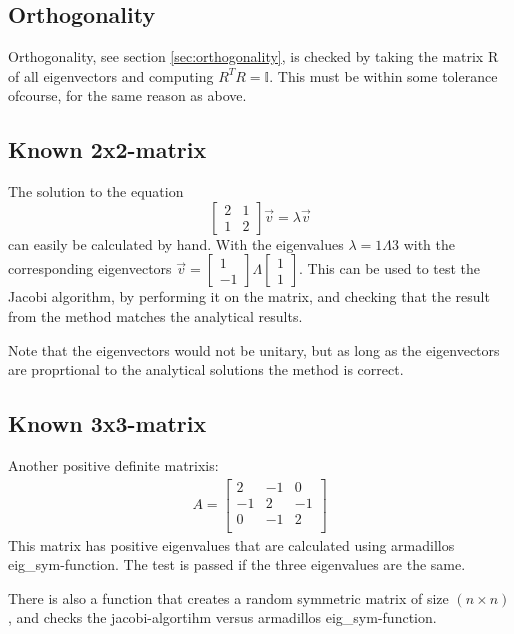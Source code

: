 \documentclass[11pt,a4paper,notitlepage]{article}
\newcommand{\eye}{\mathds{I}}
\begin{document}
\subsection{Orthogonality}
Orthogonality, see section \ref{sec:orthogonality}, is checked by taking the matrix R of all eigenvectors and computing $R^TR = \eye$. This must be within some tolerance ofcourse, for the same reason as above.
\subsection{Known 2x2-matrix}
The solution to the equation 
$$\begin{bmatrix}
	2 & 1 \\ 1 & 2
\end{bmatrix} \vec{v} = \lambda	 \vec{v} $$ 
can easily be calculated by hand.
With the eigenvalues 
$\lambda = 1 \Lambda 3$ 
with the corresponding eigenvectors 
$\vec{v} = \begin{bmatrix}
1 \\ -1
\end{bmatrix} \Lambda \begin{bmatrix}
1 \\ 1
\end{bmatrix}$. 
This can be used to test the Jacobi algorithm, by performing it on the matrix, and checking that the result from the method matches the analytical results.

Note that the eigenvectors would not be unitary, but as long as the eigenvectors are proprtional to the analytical solutions the method is correct.

\subsection{Known 3x3-matrix}
Another positive definite matrixis: 
\begin{align*}
	A = \begin{bmatrix}
		2 & -1 & 0 \\
		-1 & 2 & -1 \\
		0 & -1 & 2 \\
	\end{bmatrix}
\end{align*}
This matrix has positive eigenvalues that are calculated using armadillos eig\_sym-function. The test is passed if the three eigenvalues are the same.

There is also a function that creates a random symmetric matrix of size $(n\times n)$, and checks the jacobi-algortihm versus armadillos eig\_sym-function.
\end{document}
